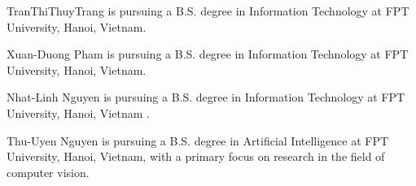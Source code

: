 \documentclass{ieeeaccess}
\providecommand{\DIFadd}[1]{{\protect\color{blue} \sf #1}} %
\providecommand{\DIFaddbegin}{} %
\providecommand{\DIFaddend}{} %
\newcommand{\DIFaddincludegraphics}[2][]{{\color{blue}\fbox{\DIFOincludegraphics[#1]{#2}}}} %
\DeclareRobustCommand{\DIFaddbegin}{\DIFOaddbegin \let\includegraphics\DIFaddincludegraphics} %
\DeclareRobustCommand{\DIFaddend}{\DIFOaddend \let\includegraphics\DIFOincludegraphics} %
\begin{document}
\begin{IEEEbiography}{TranThiThuyTrang} is pursuing a B.S. degree in Information Technology at FPT University, Hanoi, Vietnam.
\end{IEEEbiography}

\begin{IEEEbiography}{Xuan-Duong Pham} is pursuing a B.S. degree in Information Technology at FPT University, Hanoi, Vietnam.
\end{IEEEbiography}

\begin{IEEEbiography}{Nhat-Linh Nguyen} is pursuing a B.S. degree in Information Technology at FPT University, Hanoi, Vietnam\DIFaddbegin \DIFadd{.
}\end{IEEEbiography}

\begin{IEEEbiography}{\DIFadd{Thu-Uyen Nguyen}} \DIFadd{is pursuing a B.S. degree in Artificial Intelligence at FPT University, Hanoi, Vietnam, with a primary focus on research in the field of computer vision}\DIFaddend .
\end{IEEEbiography}
\end{document}
